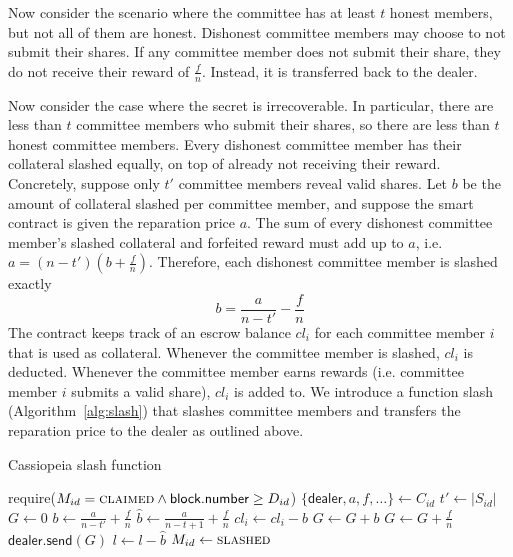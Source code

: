 Now consider the scenario where the committee has at least $t$ honest members, but not all of them are honest.
Dishonest committee members may choose to not submit their shares.
If any committee member does not submit their share, they do not receive their reward of $\frac{f}{n}$.
Instead, it is transferred back to the dealer.

Now consider the case where the secret is irrecoverable.
In particular, there are less than $t$ committee members who submit their shares, so there are less than $t$ honest committee members.
Every dishonest committee member has their collateral slashed equally, on top of already not receiving their reward.
Concretely, suppose only $t'$ committee members reveal valid shares.
Let $b$ be the amount of collateral slashed per committee member, and suppose the smart contract is given the reparation price $a$.
The sum of every dishonest committee member's slashed collateral and forfeited reward must add up to $a$, i.e. $a = (n - t')(b + \frac{f}{n})$.
Therefore, each dishonest committee member is slashed exactly
\begin{equation}\label{eq:slash_amount}
    b = \frac{a}{n - t'} - \frac{f}{n}
\end{equation}
The contract keeps track of an escrow balance $cl_i$ for each committee member $i$ that is used as collateral.
Whenever the committee member is slashed, $cl_i$ is deducted.
Whenever the committee member earns rewards (i.e. committee member $i$ submits a valid share), $cl_i$ is added to.
We introduce a function \textsf{slash} (Algorithm~\ref{alg:slash}) that slashes committee members and transfers the reparation price to the dealer as outlined above.

\begin{algorithm}[h]
\caption{Cassiopeia \textsf{slash} function}
\label{alg:slash}
    \begin{algorithmic}[1]
                \State require($M_{id} = \textsc{claimed} \land \textsf{block.number} \geq D_{id}$)
                \State $\{\textsf{dealer}, a, f, \dots\} \gets C_{id}$
                \State $t' \gets |S_{id}|$
                \State $G \gets 0$
                \State $b \gets \frac{a}{n - t'} + \frac{f}{n}$ 
                \State $\hat{b} \gets \frac{a}{n - t + 1} + \frac{f}{n}$ 
                            \State $cl_i \gets cl_i - b$
                            \State $G \gets G + b$
                        \EndIf
                        \State $G \gets G + \frac{f}{n}$
                    \EndIf
                \EndFor
                \State $\textsf{dealer.send}(G)$
                \State $l \gets l - \hat{b}$ 
                \State $M_{id} \gets \textsc{slashed}$
            \EndFunction
    \end{algorithmic}
\end{algorithm}

